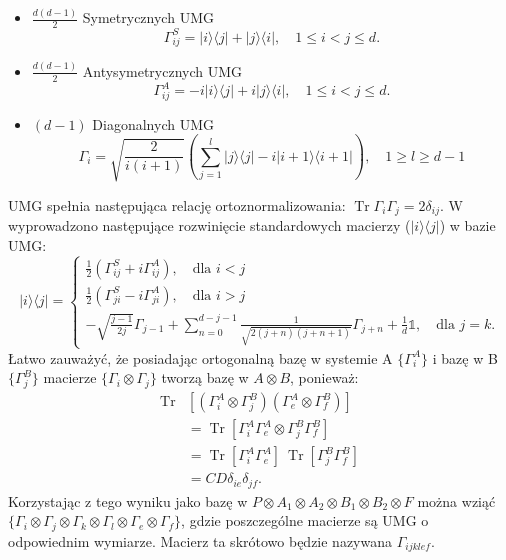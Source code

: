\documentclass[10pt]{article} %
\DeclareMathOperator{\Trs}{Tr}
\newcommand{\Ket}[1]{|#1\rangle}
\newcommand{\Bra}[1]{\langle#1|}
\newcommand{\I}{\mathbb{1}}
\begin{document}
\begin{appendices}
\begin{itemize}
\item{$\frac{d(d-1)}{2}$ Symetrycznych UMG}
\begin{equation}
\Gamma_{ij}^S = \Ket{i}\Bra{j} + \Ket{j}\Bra{i}, \quad 1 \leq i < j \leq d.
\end{equation}
\item{$\frac{d(d-1)}{2}$ Antysymetrycznych UMG}
\begin{equation}
\Gamma_{ij}^A = -i\Ket{i}\Bra{j} + i\Ket{j}\Bra{i}, \quad 1 \leq i < j \leq d.
\end{equation}
\item{$(d-1)$ Diagonalnych UMG}
\begin{equation}
\Gamma_{i} = \sqrt{\frac{2}{i(i+1)}} \left( \sum_{j=1}^{l} \Ket{j}\Bra{j} - i\Ket{i+1}\Bra{i+1}\right), \quad 1 \geq l \geq d-1
\end{equation}
\end{itemize}
UMG spełnia następująca relację ortoznormalizowania: $\Trs \Gamma_i \Gamma_j = 2\delta_{ij}$.
W \cite{gell_mann} wyprowadzono następujące rozwinięcie standardowych macierzy ($\Ket{i}\Bra{j}$) w bazie UMG:
\begin{equation}
\label{gm_ij}
\Ket{i}\Bra{j} =
\begin{cases}
\frac{1}{2} \left(\Gamma_{ij}^S + i \Gamma_{ij}^A\right), \quad \text{dla } i < j \\
\frac{1}{2} \left(\Gamma_{ji}^S - i \Gamma_{ji}^A\right), \quad \text{dla } i > j \\
- \sqrt{\frac{j-1}{2j}} \Gamma_{j-1}  + \sum_{n=0}^{d-j-1} \frac{1}{\sqrt{2(j+n)(j+n+1)}} \Gamma_{j+n} + \frac{1}{d}\I, \quad \text{dla } j=k.
\end{cases}
\end{equation}
Łatwo zauważyć, że posiadając ortogonalną bazę w systemie A $\{\Gamma_i^A\}$ i bazę w B $\{ \Gamma_j^B \}$ macierze $\{\Gamma_i \otimes \Gamma_j\}$ tworzą bazę w $A \otimes B$, ponieważ:
\begin{align}
\Trs& \left[ (\Gamma_i^A \otimes \Gamma_j^B) (\Gamma_e^A \otimes \Gamma_f^B)\right] \\
&= \Trs \left[ \Gamma_i^A \Gamma_e^A \otimes \Gamma_j^B \Gamma_f^B \right] \\
&= \Trs \left[ \Gamma_i^A \Gamma_e^A\right] ~\Trs \left[\Gamma_j^B \Gamma_f^B\right] \\
&= CD \delta_{ie} \delta_{jf}.
\end{align}
Korzystając z tego wyniku jako bazę w $P \otimes A_1 \otimes A_2 \otimes B_1 \otimes B_2 \otimes F$ można wziąć $\{ \Gamma_i \otimes \Gamma_j \otimes \Gamma_k \otimes \Gamma_l \otimes \Gamma_e \otimes \Gamma_f\}$, gdzie poszczególne macierze są UMG o odpowiednim wymiarze. Macierz ta skrótowo będzie nazywana $\Gamma_{ijklef}$.

\end{appendices}
\end{document}
